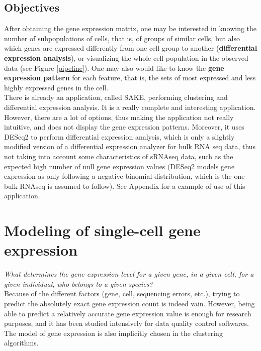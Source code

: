 \documentclass{report}
\begin{document}
\section{Objectives}

After obtaining the gene expression matrix, one may be interested in knowing the number of subpopulations of cells, that is, of groups of similar cells, but also which genes are expressed differently from one cell group to another (\textbf{differential expression analysis}), or visualizing the whole cell population in the observed data (see Figure \ref{pipeline}). One may also would like to know the \textbf{gene expression pattern} for each feature, that is, the sets of most expressed and less highly expressed genes in the cell.\\

There is already an application, called \textsc{SAKE}\cite{sake}, performing clustering and differential expression analysis. It is a really complete and interesting application. However, there are a lot of options, thus making the application not really intuitive, and does not display the gene expression patterns. Moreover, it uses DESeq2\cite{love2014moderated} to perform differential expression analysis, which is only a slightly modified version of a differential expression analyzer\cite{anders2010differential} for bulk RNA seq data, thus not taking into account some characteristics of sRNAseq data, such as the expected high number of null gene expression values (DESeq2 models gene expression as only following a negative binomial distribution, which is the one bulk RNAseq is assumed to follow). See Appendix for a example of use of this application.\\

\chapter{Modeling of single-cell gene expression}

\textit{What determines the gene expression level for a given gene, in a given cell, for a given individual, who belongs to a given species?}\\

Because of the different factors (gene, cell, sequencing errors, etc.), trying to predict the absolutely exact gene expression count is indeed vain. However, being able to predict a relatively accurate gene expression value is enough for research purposes, and it has been studied intensively for data quality control softwares\cite{kharchenko2014bayesian}\cite{finak2015mast}\cite{love2014moderated}\cite{chen2014differential}. The model of gene expression is also implicitly chosen in the clustering algorithms.\\
\end{document}
